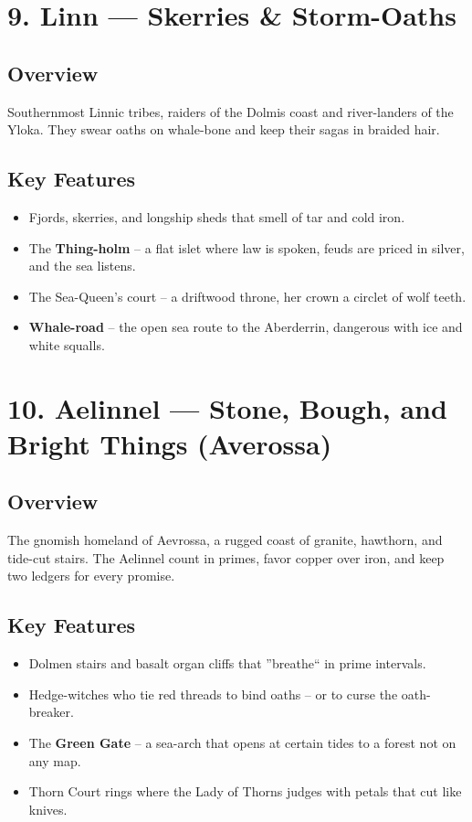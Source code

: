 \documentclass[11pt]{article}
\begin{document}
\section*{9. Linn --- Skerries \& Storm-Oaths}

\subsection*{Overview}
Southernmost Linnic tribes, raiders of the Dolmis coast and river-landers of the Yloka. They swear oaths on whale-bone and keep their sagas in braided hair.

\subsection*{Key Features}
\begin{itemize}[leftmargin=*]
    \item Fjords, skerries, and longship sheds that smell of tar and cold iron.
    \item The \textbf{Thing-holm} -- a flat islet where law is spoken, feuds are priced in silver, and the sea listens.
    \item The Sea-Queen's court -- a driftwood throne, her crown a circlet of wolf teeth.
    \item \textbf{Whale-road} -- the open sea route to the Aberderrin, dangerous with ice and white squalls.
\end{itemize}

\section*{10. Aelinnel --- Stone, Bough, and Bright Things (Averossa)}

\subsection*{Overview}
The gnomish homeland of Aevrossa, a rugged coast of granite, hawthorn, and tide-cut stairs. The Aelinnel count in primes, favor copper over iron, and keep two ledgers for every promise.

\subsection*{Key Features}
\begin{itemize}[leftmargin=*]
    \item Dolmen stairs and basalt organ cliffs that ''breathe`` in prime intervals.
    \item Hedge-witches who tie red threads to bind oaths -- or to curse the oath-breaker.
    \item The \textbf{Green Gate} -- a sea-arch that opens at certain tides to a forest not on any map.
    \item Thorn Court rings where the Lady of Thorns judges with petals that cut like knives.
\end{itemize}
\end{document}
